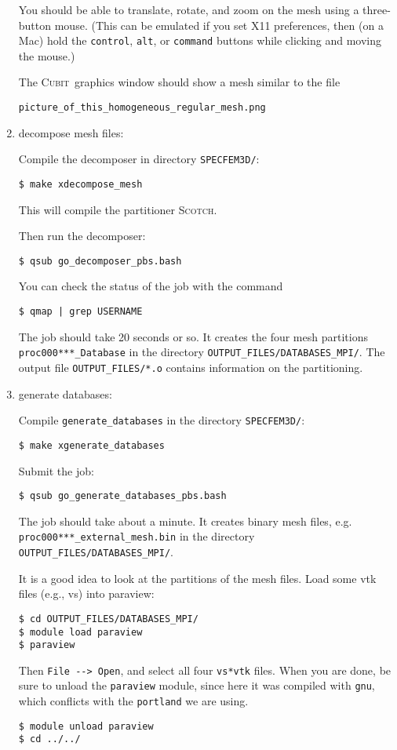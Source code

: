 \documentclass[10pt,fleqn,letterpaper]{article}
\newcommand{\cubit}{\textsc{Cubit}}
\begin{document}
\begin{enumerate}
You should be able to translate, rotate, and zoom on the mesh using a three-button mouse. (This can be emulated if you set X11 preferences, then (on a Mac) hold the \verb+control+, \verb+alt+, or \verb+command+ buttons while clicking and moving the mouse.)

The \cubit\ graphics window should show a mesh similar to the file
\begin{verbatim}
picture_of_this_homogeneous_regular_mesh.png
\end{verbatim}

\item decompose mesh files:

Compile the decomposer in directory \verb+SPECFEM3D/+:
\begin{lstlisting}
$ make xdecompose_mesh
\end{lstlisting}
%
This will compile the partitioner \textsc{Scotch}.

Then run the decomposer:
\begin{lstlisting}
$ qsub go_decomposer_pbs.bash
\end{lstlisting}
%
You can check the status of the job with the command
%
\begin{lstlisting}
$ qmap | grep USERNAME
\end{lstlisting}
%
The job should take 20 seconds or so. It creates the four mesh partitions \verb+proc000***_Database+ in the directory \verb+OUTPUT_FILES/DATABASES_MPI/+. The output file \verb+OUTPUT_FILES/*.o+ contains information on the partitioning.

\item generate databases:

Compile \verb+generate_databases+ in the directory \verb+SPECFEM3D/+:
\begin{lstlisting}
$ make xgenerate_databases
\end{lstlisting}
Submit the job:
\begin{lstlisting}
$ qsub go_generate_databases_pbs.bash
\end{lstlisting}

The job should take about a minute.
It creates binary mesh files, e.g. \verb+proc000***_external_mesh.bin+ in the directory \verb+OUTPUT_FILES/DATABASES_MPI/+.

It is a good idea to look at the partitions of the mesh files. Load some vtk files (e.g., vs) into paraview:
\begin{lstlisting}
$ cd OUTPUT_FILES/DATABASES_MPI/
$ module load paraview
$ paraview
\end{lstlisting}
%
Then \verb+File --> Open+, and select all four \verb+vs*vtk+ files. When you are done, be sure to unload the \verb+paraview+ module, since here it was compiled with \verb+gnu+, which conflicts with the \verb+portland+ we are using.
%
\begin{lstlisting}
$ module unload paraview
$ cd ../../
\end{lstlisting}


\end{enumerate}
\end{document}
